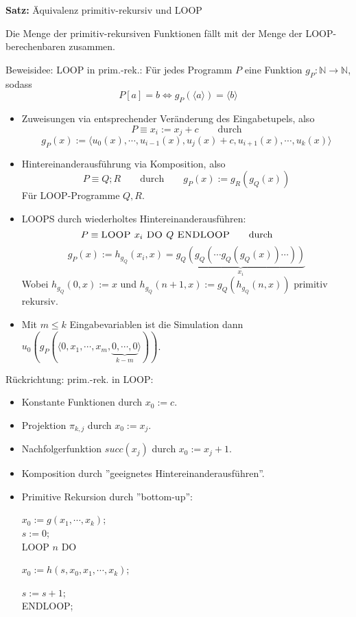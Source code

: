 \documentclass[a4paper,graphics,11pt]{article}
\begin{document}
\strut

\textbf{Satz:} Äquivalenz primitiv-rekursiv und LOOP

Die Menge der primitiv-rekursiven Funktionen fällt mit der Menge der LOOP-berechenbaren zusammen.

Beweisidee: LOOP in prim.-rek.: Für jedes Programm $P$ eine Funktion $g_P : \mathbb{N} \to \mathbb{N}$, sodass
$$
    P[a] = b \iff g_P(\langle a \rangle) = \langle b \rangle
$$
\begin{itemize}
    \item Zuweisungen via entsprechender Veränderung des Eingabetupels, also
        $$
            P \equiv x_i := x_j + c \qquad\text{durch}
        $$$$
            g_P(x) := \langle u_0(x),\cdots, u_{i-1}(x), u_j(x)+c, u_{i+1}(x),\cdots,u_k(x)\rangle
        $$
    \item Hintereinanderausführung via Komposition, also
        $$
            P \equiv Q;R \qquad\text{durch}\qquad g_P(x) := g_R(g_Q(x))
        $$
        Für LOOP-Programme $Q,R$.
    \item LOOPS durch wiederholtes Hintereinanderausführen:
        $$
            P \equiv \textsc{LOOP } x_i \textsc{ DO } Q \textsc{ ENDLOOP}
            \qquad\text{durch}\qquad
        $$$$
            g_P(x) := h_{g_Q}(x_i,x) = \underbrace{g_Q(g_Q(\cdots g_Q(g_Q(x))\cdots))}_{x_i}
        $$
        Wobei $h_{g_Q}(0,x) := x$ und $h_{g_Q}(n+1,x) := g_Q(h_{g_Q}(n,x))$ primitiv rekursiv.
    \item Mit $m \leq k$ Eingabevariablen ist die Simulation dann
        $u_0(g_P(\langle 0, x_1,\cdots,x_m,\underbrace{0,\cdots,0}_{k-m}\rangle))$.
\end{itemize}

\newpage

Rückrichtung: prim.-rek. in LOOP:
\begin{itemize}
    \item Konstante Funktionen durch $x_0 := c$.
    \item Projektion $\pi_{k,j}$ durch $x_0 := x_j$.
    \item Nachfolgerfunktion $succ(x_j)$ durch $x_0 := x_j + 1$.
    \item Komposition durch ''geeignetes Hintereinanderausführen''.
    \item Primitive Rekursion durch ''bottom-up'':

        $x_0 := g(x_1,\cdots,x_k)$;\\
        $s := 0$;\\
        \textsc{LOOP} $n$ \textsc{DO}\\
        \strut\qquad$x_0 := h(s,x_0,x_1,\cdots,x_k)$;\\
        \strut\qquad$s := s+1$;\\
        \textsc{ENDLOOP};
\end{itemize}
\end{document}
